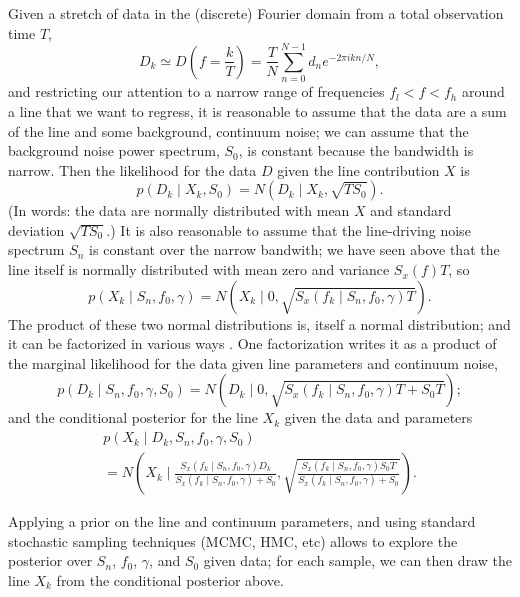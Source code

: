 \documentclass[modern]{aastex631}
\begin{document}
Given a stretch of data in the (discrete) Fourier domain from a total
observation time $T$, 
\begin{equation}
    D_k \simeq D\left( f = \frac{k}{T} \right) = \frac{T}{N} \sum_{n=0}^{N-1} d_n e^{-2\pi i k n / N},
\end{equation} 
and restricting our attention to a narrow range of frequencies $f_l < f < f_h$
around a line that we want to regress, it is reasonable to assume that the data
are a sum of the line and some background, continuum noise; we can assume that
the background noise power spectrum, $S_0$, is constant because the bandwidth is
narrow. Then the likelihood for the data $D$ given the line contribution $X$ is 
\begin{equation}
    p\left( D_k \mid X_k, S_0 \right) = N\left( D_k \mid X_k, \sqrt{T S_0} \right).
\end{equation}
(In words: the data are normally distributed with mean $X$ and standard
deviation $\sqrt{T S_0}$.)  It is also reasonable to assume that the
line-driving noise spectrum $S_n$ is constant over the narrow bandwith; we have
seen above that the line itself is normally distributed with mean zero and
variance $S_x(f) T$, so 
\begin{equation}
    p\left( X_k \mid S_n, f_0, \gamma \right) = N\left( X_k \mid 0, \sqrt{S_x\left(f_k \mid S_n, f_0, \gamma \right) T} \right).
\end{equation}
The product of these two normal distributions is, itself a normal distribution;
and it can be factorized in various ways \citep{Hogg2020}.  One factorization
writes it as a product of the marginal likelihood for the data given line
parameters and continuum noise,
\begin{equation}
    p\left( D_k \mid S_n, f_0, \gamma, S_0 \right) = N\left( D_k \mid 0, \sqrt{S_x\left(f_k \mid S_n, f_0, \gamma \right) T + S_0 T} \right);
\end{equation}
and the conditional posterior for the line $X_k$ given the data and parameters 
\begin{multline}
    p\left( X_k \mid D_k, S_n, f_0, \gamma, S_0 \right) \\ = N\left( X_k \mid \frac{S_x\left(f_k \mid S_n, f_0, \gamma \right) D_k}{S_x\left(f_k \mid S_n, f_0, \gamma \right) + S_0}, \sqrt{\frac{S_x\left(f_k \mid S_n, f_0, \gamma \right) S_0 T}{S_x\left(f_k \mid S_n, f_0, \gamma \right) + S_0}} \right).
\end{multline}

Applying a prior on the line and continuum parameters, and using standard
stochastic sampling techniques (MCMC, HMC, etc) allows to explore the posterior
over $S_n$, $f_0$, $\gamma$, and $S_0$ given data; for each sample, we can then
draw the line $X_k$ from the conditional posterior above.  
\end{document}
